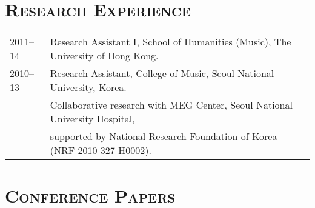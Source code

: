 \documentclass[a4,11pt,draft]{article}
\begin{document}
  \vspace{2.5mm}
  
  \section*{\textsc{Research Experience}}
  
  \hspace*{-0.25cm}
  \begin{tabular}{p{2.5cm} l}
    2011--14 & Research Assistant I, School of Humanities (Music), The University of Hong Kong.\\[2mm]
    
    2010--13 & Research Assistant, College of Music, Seoul National University, Korea.\\
    & Collaborative research with MEG Center, Seoul National University Hospital,\\
    & supported by National Research Foundation of Korea (NRF-2010-327-H0002).
  \end{tabular}
  
  \vspace*{2.5mm}
  
  \section*{\textsc{Conference Papers}}
  
\end{document}
